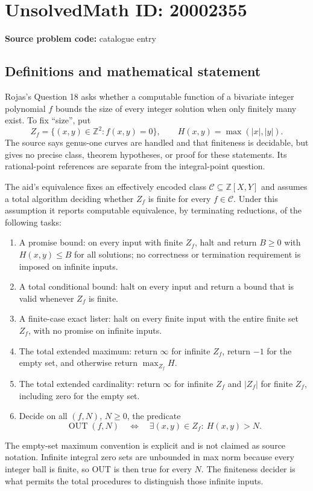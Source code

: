 \documentclass[11pt]{article}
\newcommand{\Z}{\mathbb{Z}}
\begin{document}
\section*{UnsolvedMath ID: 20002355}
\textbf{Source problem code:} catalogue entry
\subsection{Definitions and mathematical statement}
Rojas's Question 18 asks whether a computable function of a bivariate integer polynomial \(f\) bounds the size of every integer solution when only finitely many exist. To fix ``size'', put
\[
 Z_f=\{(x,y)\in\Z^2:f(x,y)=0\},\qquad
 H(x,y)=\max(|x|,|y|).
\]
The source says genus-one curves are handled and that finiteness is decidable, but gives no precise class, theorem hypotheses, or proof for these statements. Its rational-point references are separate from the integral-point question.

The aid's equivalence fixes an effectively encoded class \(\mathcal C\subseteq\Z[X,Y]\) and assumes a total algorithm deciding whether \(Z_f\) is finite for every \(f\in\mathcal C\). Under this assumption it reports computable equivalence, by terminating reductions, of the following tasks:
\begin{enumerate}
\item A promise bound: on every input with finite \(Z_f\), halt and return \(B\ge0\) with \(H(x,y)\le B\) for all solutions; no correctness or termination requirement is imposed on infinite inputs.
\item A total conditional bound: halt on every input and return a bound that is valid whenever \(Z_f\) is finite.
\item A finite-case exact lister: halt on every finite input with the entire finite set \(Z_f\), with no promise on infinite inputs.
\item The total extended maximum: return \(\infty\) for infinite \(Z_f\), return \(-1\) for the empty set, and otherwise return \(\max_{Z_f}H\).
\item The total extended cardinality: return \(\infty\) for infinite \(Z_f\) and \(|Z_f|\) for finite \(Z_f\), including zero for the empty set.
\item Decide on all \((f,N)\), \(N\ge0\), the predicate
\[
 \operatorname{OUT}(f,N)\quad\Longleftrightarrow\quad
 \exists(x,y)\in Z_f:\ H(x,y)>N.
\]
\end{enumerate}
The empty-set maximum convention is explicit and is not claimed as source notation. Infinite integral zero sets are unbounded in max norm because every integer ball is finite, so OUT is then true for every \(N\). The finiteness decider is what permits the total procedures to distinguish those infinite inputs.
\end{document}
